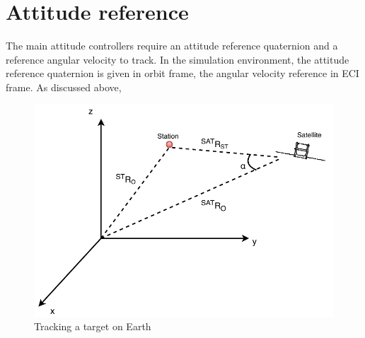 \section{Attitude reference}

The main attitude controllers require an attitude reference quaternion and a reference angular velocity to track. In the simulation environment, the attitude reference quaternion is given in orbit frame, the angular velocity reference in ECI frame. As discussed above,

%
%
%

\begin{figure}[H]
	\centering
	\includegraphics[width=0.7\linewidth]{figures/ST}
	\caption{Tracking a target on Earth }
	\label{fig:TS}
\end{figure}

